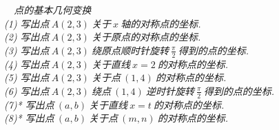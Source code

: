    {\it {}\ \ 点的基本几何变换\\
    \indent \indent (1) 写出点$\ A(2,3)\ $关于$\ x\ $轴的对称点的坐标.\\
    \indent \indent (2) 写出点$\ A(2,3)\ $关于原点的对称点的坐标.\\
    \indent \indent (3) 写出点$\ A(2,3)\ $绕原点顺时针旋转$\ \frac{\pi}{2}\ $得到的点的坐标.\\
    \indent \indent (4) 写出点$\ A(2,3)\ $关于直线$\ x=2\ $的对称点的坐标.\\
    \indent \indent (5) 写出点$\ A(2,3)\ $关于点$\ (1,4)\ $的对称点的坐标.\\
    \indent \indent (6) 写出点$\ A(2,3)\ $绕点$\ (1,4)\ $逆时针旋转$\ \frac{\pi}{2}\ $得到的点的坐标.\\
    \indent \indent (7)* 写出点$\ (a,b)\ $关于直线$\ x=t\ $的对称点的坐标.\\
    \indent \indent (8)* 写出点$\ (a,b)\ $关于点$\ (m,n)\ $的对称点的坐标.\\}
